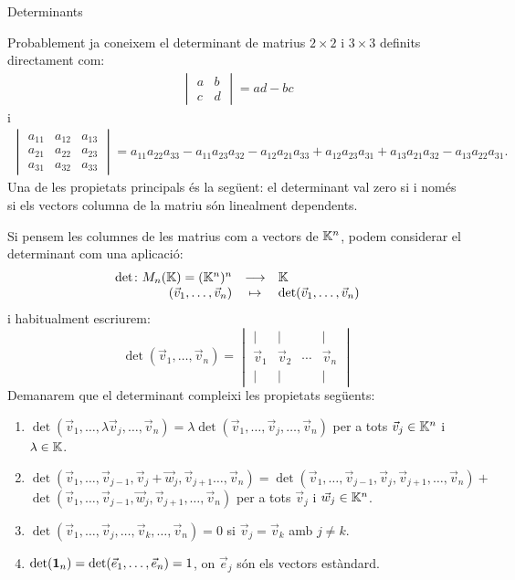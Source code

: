 \documentclass[
  11pt,
]{book}
\makeatletter
\numberwithin{dummy}{section}
\theoremstyle{maincolornumbox}
\theoremstyle{blacknumex}
\theoremstyle{blacknumbox}
\theoremstyle{maincolornum}
\renewcommand{\section}{\@startsection{section}{1}{\z@}
{-4ex \@plus -1ex \@minus -.4ex}
{1ex \@plus.2ex }
{\normalfont\large\sffamily\bfseries}}
\makeatother
\begin{document}
\section{Determinants}\label{determinants}

Probablement ja coneixem el determinant de matrius \(2\times 2\) i
\(3\times 3\) definits directament com: \begin{align}
\label{eq:det2}
\begin{vmatrix}
a & b \\ c & d  
\end{vmatrix}= ad -bc
\end{align} i \begin{align}
\label{eq:det3}
\begin{vmatrix}
a_{11} & a_{12} & a_{13}\\
a_{21} & a_{22} & a_{23}\\
a_{31} & a_{32} & a_{33}
\end{vmatrix} = a_{11}a_{22}a_{33}-a_{11}a_{23}a_{32}-a_{12}a_{21}a_{33}+a_{12}a_{23}a_{31}+a_{13}a_{21}a_{32}-a_{13}a_{22}a_{31}.
\end{align} Una de les propietats principals és la següent: el
determinant val zero si i només si els vectors columna de la matriu són
linealment dependents.

Si pensem les columnes de les matrius com a vectors de \(\mathbb{K}^n\), podem
considerar el determinant com una aplicació: \[\begin{array}{rcl}
\det \colon M_n(\mathbb{K})=(\mathbb{K}^n)^n & \longrightarrow & \mathbb{K} \\
(\vec v_1, \dots , \vec v_n) & \mapsto & \det(\vec v_1, \dots , \vec v_n)
\end{array}\] i habitualment escriurem:
\[\det(\vec v_1, \dots, \vec v_n)=\begin{vmatrix}
\mid & \mid & & \mid \\
\vec v_1 & \vec v_2 & \cdots & \vec v_n \\
\mid & \mid & & \mid
\end{vmatrix}\] Demanarem que el determinant compleixi les propietats
següents:

\begin{enumerate}
\def\labelenumi{\arabic{enumi}.}
\item
  \(\det(\vec v_1, \dots, \lambda \vec v_j, \dots,\vec v_n)=\lambda \det(\vec v_1, \dots, \vec v_j, \dots,\vec v_n)\)
  per a tots \(\vec v_j\in \mathbb{K}^n\) i \(\lambda \in \mathbb{K}\).
\item
  \(\det(\vec v_1, \dots, \vec v_{j-1}, \vec v_j+\vec w_j, \vec v_{j+1} \dots,\vec v_n)= \det(\vec v_1, \dots, \vec v_{j-1},\vec v_j,\vec v_{j+1}, \dots,\vec v_n) +\)\\
  \(\det(\vec v_1, \dots, \vec v_{j-1},\vec w_j,\vec v_{j+1}, \dots,\vec v_n)\)
  per a tots \(\vec v_j\) i \(\vec w_j\in \mathbb{K}^n\).
\item
  \(\det(\vec v_1,\dots , \vec v_j, \dots, \vec v_k, \dots ,\vec v_n)=0\)
  si \(\vec v_j=\vec v_k\) amb \(j\neq k\).
\item
  \(\det(\mathbf{1}_n)=\det(\vec e_1, \dots, \vec e_n)=1\), on \(\vec e_j\) són
  els vectors estàndard.
\end{enumerate}
\end{document}
